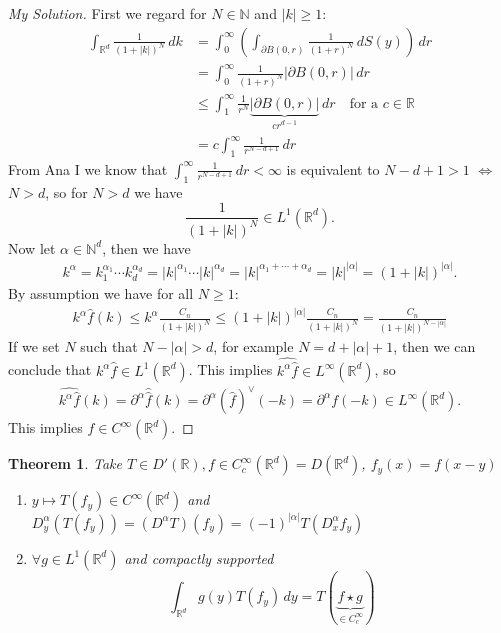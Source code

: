 \documentclass{report}
\theoremstyle{tommy}
\newtheorem{thm}[defn]{Theorem}
\begin{document}
  \begin{proof}[My Solution]
    First we regard for \(N \in \mathbb{N}\) and \(|k| \ge 1\):
    \begin{align*}
      \int_{\mathbb{R}^d} \frac{1}{(1 + |k|)^N} \, dk 
      &= \int_0^\infty \left(\int_{\partial B(0, r)} \frac{1}{(1+r)^N} \, dS(y)\right) \, dr \\
      &= \int_0^\infty \frac{1}{(1+r)^N} |\partial B(0, r)| \, dr \\
      &\le \int_1^\infty \frac{1}{r^N} \underbrace{|\partial B(0,r)|}_{c r^{d-1}} \, dr \quad \text{for a } c \in \mathbb{R} \\
      &= c \int_1^\infty \frac{1}{r^{N-d+1}} \, dr
    \end{align*}
    From Ana I we know that \(\int_1^\infty \frac{1}{r^{N-d+1}} \, dr < \infty\) is equivalent to \(N-d+1 > 1\) \(\Leftrightarrow\) \(N > d\), so for \(N > d\) we have 
    \[\frac{1}{(1+|k|)^N} \in L^1(\mathbb{R}^d).\]
    Now let \(\alpha \in \mathbb{N}^d\), then we have
    \begin{align*}
      k^\alpha 
      = k_1^{\alpha_1} \cdots k_d^{\alpha_d}
      = |k|^{\alpha_1} \cdots |k|^{\alpha_d}
      = |k|^{\alpha_1 + \cdots + \alpha_d}
      = |k|^{|\alpha|}
      = (1 + |k|)^{|\alpha|}.
    \end{align*}
    By assumption we have for all \(N \ge 1\):
    \begin{align*}
      k^\alpha \hat f(k) 
      \le k^\alpha \frac{C_n}{(1 + |k|)^N}
      \le (1 + |k|)^{|\alpha|} \frac{C_n}{(1 + |k|)^N}
      = \frac{C_n}{(1 + |k|)^{N - |\alpha|}}
    \end{align*}
    If we set \(N\) such that \(N - |\alpha| > d\), for example \(N = d + |\alpha| + 1\), then we can conclude that \(k^\alpha \hat f \in L^1(\mathbb{R}^d)\). This implies \(\widehat{k^\alpha \hat f} \in L^\infty(\mathbb{R}^d)\), so
    \begin{align*}
      \widehat{k^\alpha \hat f} (k)
      = \partial^\alpha \widehat{\hat f}(k)
      = \partial^\alpha (\hat f)^\lor (-k)
      = \partial^\alpha f(-k) \in L^\infty(\mathbb{R}^d).
    \end{align*}
    This implies \(f \in C^\infty(\mathbb{R}^d)\).
  \end{proof}
  
  \begin{thm}
    Take \(T \in D'(\mathbb{R}), f \in C_c^\infty(\mathbb{R}^d) = D(\mathbb{R}^d)\), \(f_y(x) = f(x-y)\)
    \begin{enumerate}[label=\alph*)]
      \item \(y \mapsto T(f_y) \in C^\infty(\mathbb{R}^d)\) and \(D_y^\alpha(T(f_y)) = (D^\alpha T) (f_y) = (-1)^{|\alpha|} T(D_x^\alpha f_y)\)
      \item \(\forall g \in L^1(\mathbb{R}^d)\) and compactly supported 
      \[\int_{\mathbb{R}^d} g(y) T(f_y) \, dy = T(\underbrace{f \star g}_{\in C_c^\infty})\]
    \end{enumerate}
  \end{thm}
\end{document}
